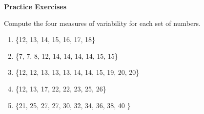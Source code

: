 \textbf{Practice Exercises}

\vspce

Compute the four measures of variability for each set of numbers. 
\begin{enumerate}[label = \arabic*. ]
\item \{12, 13, 14, 15, 16, 17, 18\}
\item \{7, 7, 8, 12, 14, 14, 14, 14, 15, 15\}
\item \{12, 12, 13, 13, 13, 14, 14, 15, 19, 20, 20\}
\item \{12, 13, 17, 22, 22, 23, 25, 26\}
\item \{21, 25,
27, 27, 30, 32, 34, 36, 38, 40
\}
\end{enumerate} 
  


  
  
  
  
  